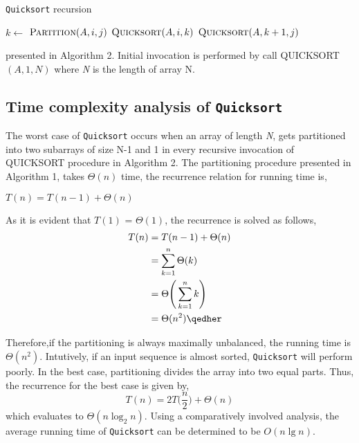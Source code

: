 \documentclass[a4paper, 10pt,twocolumn]{article}
\begin{document}
\begin{algorithm}
  \caption{\texttt{Quicksort} recursion}
  \label{algo:ins_sort1}
  \begin{algorithmic}[1]
     \newline
     
            \State   $k\leftarrow$ $\textsc{Partition}(A,i,j)$ 
            \State  $\textsc{Quicksort}(A, i, k)$ 
            \State  $\textsc{Quicksort}(A, k + 1, j)$ 
      \EndIf
      \EndProcedure 
  \end{algorithmic}
\end{algorithm} \newline

\noindent presented in Algorithm 2. Initial invocation is performed
by call QUICKSORT$(A, 1, N)$ where \textit{N} is
the length of array N.

\subsection{Time complexity analysis of \texttt{Quicksort}}
The worst case of \texttt{Quicksort} occurs when an array of length \textit{N}, gets partitioned into two subarrays of size N-1 and 1 in every recursive invocation of QUICKSORT procedure in Algorithm 2. The partitioning procedure presented in Algorithm 1, takes $\Theta(n)$ time, the recurrence relation for running time
is,\begin{center}
    $ T(n) = T(n-1) + \Theta(n)$
\end{center}
As it is evident that $T(1)$ = $\Theta(1)$, the recurrence is solved as follows,
\begin{align*}
     T(n) &= T(n-1) + \Theta(n)\\
          &= \sum_{k=1}^{n} \Theta (k) \\
          &= \Theta\Bigg(\sum_{k=1}^{n}k\Bigg) \\
          &= \Theta(n^2) \qedher
\end{align*}

Therefore,if the partitioning is always maximally
unbalanced, the running time is $\Theta(n^2)$. Intutively, if an input sequence is almost sorted, \texttt{Quicksort} will perform poorly. In the best case, partitioning divides the array into two equal parts. Thus, the
recurrence for the best case is given by,
\begin{equation*}
    T(n) = 2T\bigg(\frac{n}{2}\bigg)+ \Theta(n)
\end{equation*}
\newline
which evaluates to $\Theta(n \log_2 n)$. Using a comparatively
involved analysis, the average running time
of \texttt{Quicksort} can be determined to be $O(n \lg n)$.
\end{document}
